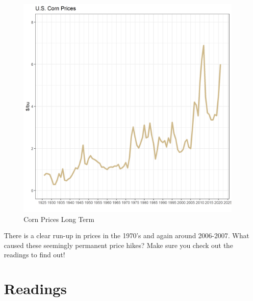 \documentclass[
  letterpaper,
  DIV=11,
  numbers=noendperiod]{scrreprt}
\begin{document}
\begin{figure}

{\centering \includegraphics{assets/PrimerforGrain_CornPrices.png}

}

\caption{Corn Prices Long Term}

\end{figure}

There is a clear run-up in prices in the 1970's and again around
2006-2007. What caused these seemingly permanent price hikes? Make sure
you check out the readings to find out!

\hypertarget{readings}{%
\section{Readings}\label{readings}}
\end{document}

